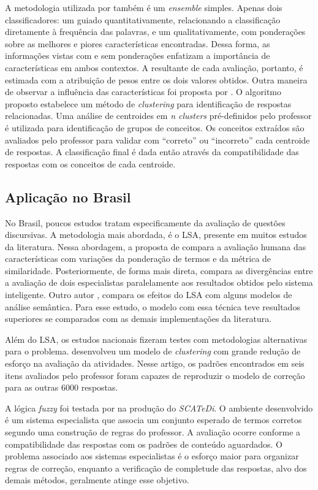 A metodologia utilizada por  também é um \textit{ensemble} simples. Apenas dois classificadores: um guiado quantitativamente, relacionando a classificação diretamente à frequência das palavras, e um qualitativamente, com ponderações sobre as melhores e piores características encontradas. Dessa forma, as informações vistas com e sem ponderações enfatizam a importância de características em ambos contextos. A resultante de cada avaliação, portanto, é estimada com a atribuição de pesos entre os dois valores obtidos. Outra maneira de observar a influência das características foi proposta por . O algoritmo proposto estabelece um método de \textit{clustering} para identificação de respostas relacionadas. Uma análise de centroides em \textit{n clusters} pré-definidos pelo professor é utilizada para identificação de grupos de conceitos. Os conceitos extraídos são avaliados pelo professor para validar com ``correto'' ou ``incorreto'' cada centroide de respostas. A classificação final é dada então através da compatibilidade das respostas com os conceitos de cada centroide.

\subsection{Aplicação no Brasil}
No Brasil, poucos estudos tratam especificamente da avaliação de questões discursivas. A metodologia mais abordada, é o LSA, presente em muitos estudos da literatura. Nessa abordagem, a proposta de  compara a avaliação humana das características com variações da ponderação de termos e da métrica de similaridade. Posteriormente, de forma mais direta,  compara as divergências entre a avaliação de dois especialistas paralelamente aos resultados obtidos pelo sistema inteligente. Outro autor , compara os efeitos do LSA com alguns modelos de análise semântica. Para esse estudo, o modelo com essa técnica teve resultados superiores se comparados com as demais implementações da literatura.

Além do LSA, os estudos nacionais fizeram testes com metodologias alternativas para o problema.  desenvolveu um modelo de \textit{clustering} com grande redução de esforço na avaliação da atividades. Nesse artigo, os padrões encontrados em seis itens avaliados pelo professor foram capazes de reproduzir o modelo de correção para as outras 6000 respostas. 

A  lógica \textit{fuzzy} foi testada por  na produção do \textit{SCATeDi}. O ambiente desenvolvido é um sistema especialista que associa um conjunto esperado de termos corretos segundo uma construção de regras do professor. A avaliação ocorre conforme a compatibilidade das respostas com os padrões de conteúdo aguardados. O problema associado aos sistemas especialistas é o esforço maior para organizar regras de correção, enquanto a verificação de completude das respostas, alvo dos demais métodos, geralmente atinge esse objetivo.


